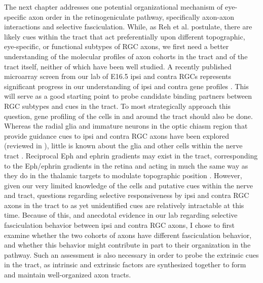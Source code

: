 The next chapter addresses one potential organizational mechanism of eye-specific axon order in the retinogeniculate pathway, specifically axon-axon interactions and selective fasciculation.
While, as Reh et al.  postulate, there are likely cues within the tract that act preferentially upon different topographic, eye-specific, or functional subtypes of RGC axons, we first need a better understanding of the molecular profiles of axon cohorts in the tract and of the tract itself, neither of which have been well studied.
A recently published microarray screen from our lab of E16.5 ipsi and contra RGCs represents significant progress in our understanding of ipsi and contra gene profiles \cite{wang2016ipsilateral}.
This will serve as a good starting point to probe candidate binding partners between RGC subtypes and cues in the tract.
To most strategically approach this question, gene profiling of the cells in and around the tract should also be done.
Whereas the radial glia and immature neurons in the optic chiasm region that provide guidance cues to ipsi and contra RGC axons have been explored (reviewed in ), little is known about the glia and other cells within the nerve tract \cite{colello1992observations,guillery1987changing}.
Reciprocal Eph and ephrin gradients may exist in the tract, corresponding to the Eph/ephrin gradients in the retina and acting in much the same way as they do in the thalamic targets to modulate topographic position \cite{feldheim2010visual,flanagan2006neural,mclaughlin2005molecular}.
However, given our very limited knowledge of the cells and putative cues within the nerve and tract, questions regarding selective responsiveness by ipsi and contra RGC axons in the tract to as yet unidentified cues are relatively intractable at this time.
Because of this, and anecdotal evidence in our lab regarding selective fasciculation behavior between ipsi and contra RGC axons, I chose to first examine whether the two cohorts of axons have different fasciculation behavior, and whether this behavior might contribute in part to their organization in the pathway.
Such an assessment is also necessary in order to probe the extrinsic cues in the tract, as intrinsic and extrinsic factors are synthesized together to form and maintain well-organized axon tracts.